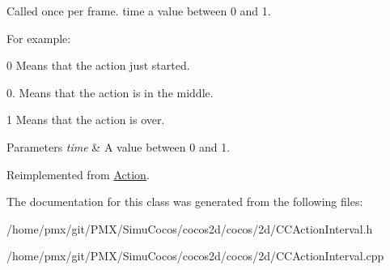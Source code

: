 Called once per frame. time a value between 0 and 1.

For example\+:
\begin{DoxyItemize}
\item 0 Means that the action just started.
\item 0. Means that the action is in the middle.
\item 1 Means that the action is over.
\end{DoxyItemize}


\begin{DoxyParams}{Parameters}
{\em time} & A value between 0 and 1. \\
\hline
\end{DoxyParams}


Reimplemented from \hyperlink{classAction_a937e646e63915e33ad05ba149bfcf239}{Action}.



The documentation for this class was generated from the following files\+:\begin{DoxyCompactItemize}
\item 
/home/pmx/git/\+P\+M\+X/\+Simu\+Cocos/cocos2d/cocos/2d/C\+C\+Action\+Interval.\+h\item 
/home/pmx/git/\+P\+M\+X/\+Simu\+Cocos/cocos2d/cocos/2d/C\+C\+Action\+Interval.\+cpp\end{DoxyCompactItemize}
